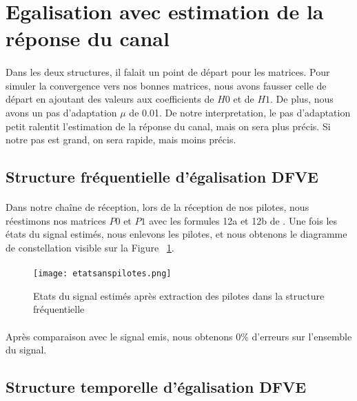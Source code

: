 \section{Egalisation avec estimation de la réponse du canal}

\paragraph{}
Dans les deux structures, il falait un point de départ pour les matrices. Pour simuler la convergence vers nos bonnes matrices, nous avons fausser celle de départ en ajoutant des valeurs aux coefficients de $H0$ et de $H1$. De plus, nous avons un pas d'adaptation $\mu$ de 0.01. De notre interpretation, le pas d'adaptation petit ralentit l'estimation de la réponse du canal, mais on sera plus précis. Si notre pas est grand, on sera rapide, mais moins précis.

\subsection{Structure fréquentielle d'égalisation DFVE}
\paragraph{}
Dans notre chaîne de réception, lors de la réception de nos pilotes, nous réestimons nos matrices $P0$ et $P1$ avec les formules 12a et 12b de \cite{sujet}. Une fois les états du signal estimés, nous enlevons les pilotes, et nous obtenons le diagramme de constellation visible sur la Figure ~\ref{etatsanspilote}.

\paragraph{}
\vspace{1\baselineskip}
\begin{figure}[!h]
  \centering
  \texttt{[image: etatsanspilotes.png]}
  \caption{Etats du signal estimés après extraction des pilotes dans la structure fréquentielle }
	\label{etatsanspilote} 
\end{figure}

\paragraph{}
Après comparaison avec le signal emis, nous obtenons 0\% d'erreurs sur l'ensemble du signal.


\subsection{Structure temporelle d'égalisation DFVE}

